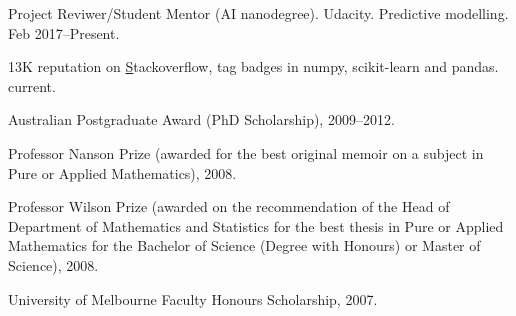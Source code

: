 \documentclass[10pt,a4paper]{article}
\renewenvironment{itemize}{
  \begin{list}{}{
    \setlength{\leftmargin}{1.5em}
    \setlength{\itemsep}{0.25em}
    \setlength{\parskip}{0pt}
    \setlength{\parsep}{0.25em}
  }
}{
  \end{list}
}
\begin{document}
\begin{itemize}
\item Project Reviwer/Student Mentor (AI nanodegree). Udacity. Predictive modelling. Feb 2017--Present.
\item 13K reputation on \href{http://stackoverflow.com/users/839957/maxymoo?tab=profile}Stackoverflow, tag badges in numpy, scikit-learn and pandas. current.
\item Australian Postgraduate Award (PhD Scholarship), 2009--2012.
\item Professor Nanson Prize (awarded for the best original memoir on a subject in Pure or Applied Mathematics), 2008.
\item Professor Wilson Prize (awarded on the recommendation of the Head of Department of Mathematics and Statistics for the best thesis in Pure or Applied Mathematics for the Bachelor of Science (Degree with Honours) or Master of Science), 2008.
\item University of Melbourne Faculty Honours Scholarship, 2007.
\end{itemize}


%
\end{document}
